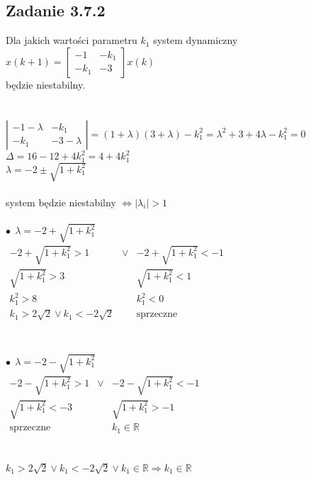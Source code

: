 \pagebreak
\subsection*{Zadanie 3.7.2} {\color{darkgray}
	Dla jakich wartości parametru $k_1$ system dynamiczny\\
	$x(k+1)=\left[ \begin{array}{cc}    -1 &-k_1 \\ -k_1 &-3    \end{array}\right]x(k)$\\
	będzie niestabilny.\\
}\lineh
\\\\
$\left| \begin{array}{cc}    -1 -\lambda&-k_1 \\ -k_1 &-3-\lambda    \end{array}\right|=(1+\lambda)(3+\lambda)-k_1^2=\lambda^2+3+4\lambda-k_1^2=0$\\
$\Delta=16-12+4k_1^2=4+4k_1^2$\\
$\lambda=-2 \pm \sqrt{1+k_1^2}$\\
\\
system będzie niestabilny $\Leftrightarrow |\lambda_i|>1$\\
\\
$\bullet\ \ \lambda=-2 + \sqrt{1+k_1^2}$\\
$ \begin{array}{ccc}
-2 + \sqrt{1+k_1^2}>1                &\vee&    -2 + \sqrt{1+k_1^2}<-1  \\
\sqrt{1+k_1^2}>3                           & &         \sqrt{1+k_1^2}<1 \\
k_1^2>8                                           & &                  k_1^2<0\\
k_1>2\sqrt{2} \vee k_1<-2\sqrt{2} & &                     \text{sprzeczne}\\
\end{array} $\\
\\\\
$\bullet\ \ \lambda=-2 - \sqrt{1+k_1^2}$\\
$ \begin{array}{ccc}
-2 - \sqrt{1+k_1^2}>1                &\vee&    -2 - \sqrt{1+k_1^2}<-1  \\
\sqrt{1+k_1^2}<-3                           & &         \sqrt{1+k_1^2}>-1 \\
\text{sprzeczne}                                & &                  k_1 \in \mathbb{R}
\end{array} $\\
\\\\
$k_1>2\sqrt{2} \vee k_1<-2\sqrt{2} \vee  k_1 \in \mathbb{R} \Rightarrow k_1 \in \mathbb{R}$

